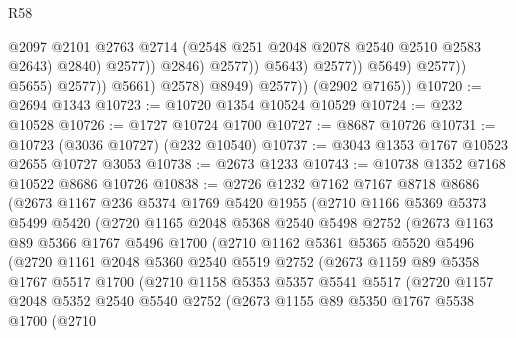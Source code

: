 \begin{lexlean}{R58}
\begin{coremodule}
                                              @2097
                                              @2101
                                              @2763
                                              @2714
                                              (@2548 @251 @2048 @2078 @2540 @2510 @2583 @2643)
                                              @2840)
                                            @2577))
                                        @2846)
                                      @2577))
                                  @5643)
                                @2577))
                            @5649)
                          @2577))
                      @5655)
                    @2577))
                @5661)
              @2578)
            @8949)
          @2577))
      (@2902 @7165))
@10720 := @2694 @1343
@10723 := @10720 @1354 @10524 @10529
@10724 := @232 @10528
@10726 := @1727 @10724 @1700
@10727 := @8687 @10726
@10731 := @10723 (@3036 @10727) (@232 @10540)
@10737 := @3043 @1353 @1767 @10523 @2655 @10727 @3053
@10738 := @2673 @1233
@10743 := @10738 @1352 @7168 @10522 @8686 @10726
@10838 := @2726
    @1232
    @7162
    @7167
    @8718
    @8686
    (@2673
      @1167
      @236
      @5374
      @1769
      @5420
      @1955
      (@2710
        @1166
        @5369
        @5373
        @5499
        @5420
        (@2720
          @1165
          @2048
          @5368
          @2540
          @5498
          @2752
          (@2673
            @1163
            @89
            @5366
            @1767
            @5496
            @1700
            (@2710
              @1162
              @5361
              @5365
              @5520
              @5496
              (@2720
                @1161
                @2048
                @5360
                @2540
                @5519
                @2752
                (@2673
                  @1159
                  @89
                  @5358
                  @1767
                  @5517
                  @1700
                  (@2710
                    @1158
                    @5353
                    @5357
                    @5541
                    @5517
                    (@2720
                      @1157
                      @2048
                      @5352
                      @2540
                      @5540
                      @2752
                      (@2673
                        @1155
                        @89
                        @5350
                        @1767
                        @5538
                        @1700
                        (@2710

\end{coremodule}
\end{lexlean}
